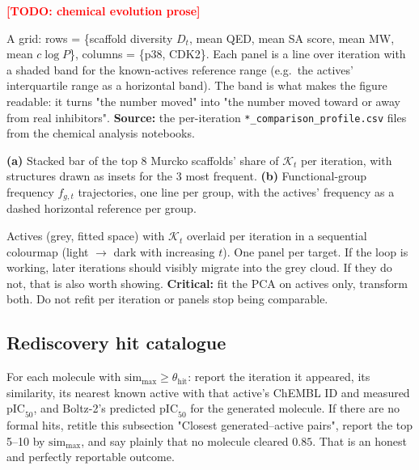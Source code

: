 \documentclass[11pt]{article}
\newcommand{\TODO}[1]{\textcolor{red}{\textbf{[TODO: #1]}}}
\newcommand{\pICfifty}{\mathrm{pIC}_{50}}
\newcommand{\TopK}{\mathcal{K}}                 %
\newcommand{\simmax}{\mathrm{sim}_{\max}}
\newcommand{\thetahit}{\theta_{\mathrm{hit}}}
\begin{document}
\TODO{chemical evolution prose}

\begin{figrec}
A grid: rows = \{scaffold diversity $D_t$, mean QED, mean SA score,
mean MW, mean $c\log P$\}, columns = \{p38, CDK2\}. Each panel is a line over
iteration with a shaded band for the known-actives reference range
(e.g.\ the actives' interquartile range as a horizontal band). The band is what
makes the figure readable: it turns "the number moved" into "the number moved
toward or away from real inhibitors".
\textbf{Source:} the per-iteration \texttt{*\_comparison\_profile.csv} files
from the chemical analysis notebooks.
\end{figrec}

\begin{figrec}
\textbf{(a)} Stacked bar of the top 8 Murcko scaffolds' share of $\TopK_t$ per
iteration, with structures drawn as insets for the 3 most frequent.
\textbf{(b)} Functional-group frequency $f_{g,t}$ trajectories, one line per
group, with the actives' frequency as a dashed horizontal reference per group.
\end{figrec}

\begin{figrec}
Actives (grey, fitted space) with $\TopK_t$ overlaid per iteration in a
sequential colourmap (light $\rightarrow$ dark with increasing $t$). One panel
per target. If the loop is working, later iterations should visibly migrate
into the grey cloud. If they do not, that is also worth showing.
\textbf{Critical:} fit the PCA on actives only, transform both. Do not refit per
iteration or panels stop being comparable.
\end{figrec}

\subsection{Rediscovery hit catalogue}
\label{sec:results:hits}

\begin{yourturn}
For each molecule with $\simmax \ge \thetahit$: report the iteration it appeared,
its similarity, its nearest known active with that active's ChEMBL ID and
measured $\pICfifty$, and Boltz-2's predicted $\pICfifty$ for the generated
molecule. If there are no formal hits, retitle this subsection
"Closest generated--active pairs", report the top 5--10 by $\simmax$, and say
plainly that no molecule cleared $0.85$. That is an honest and perfectly
reportable outcome.
\end{yourturn}
\end{document}
